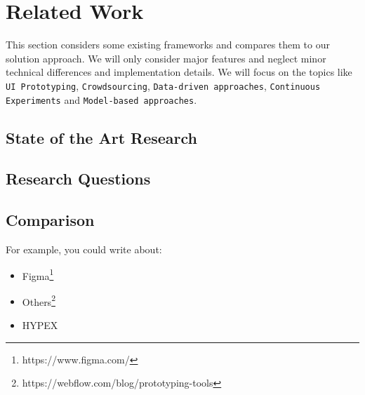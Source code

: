 \chapter{Related Work} \label{chap:csr}

This section considers some existing frameworks and compares them to our solution approach. 
We will only consider major features and neglect minor technical differences and implementation details. 
We will focus on the topics like \texttt{UI Prototyping}, \texttt{Crowdsourcing}, \texttt{Data-driven approaches}, \texttt{Continuous Experiments} and \texttt{Model-based approaches}. 

\section{State of the Art Research}
\section{Research Questions}
\section{Comparison}

For example, you could write about: 
\begin{itemize}
	\item Figma\footnote{https://www.figma.com/}
	\item Others\footnote{https://webflow.com/blog/prototyping-tools} 	
	\item HYPEX
\end{itemize}